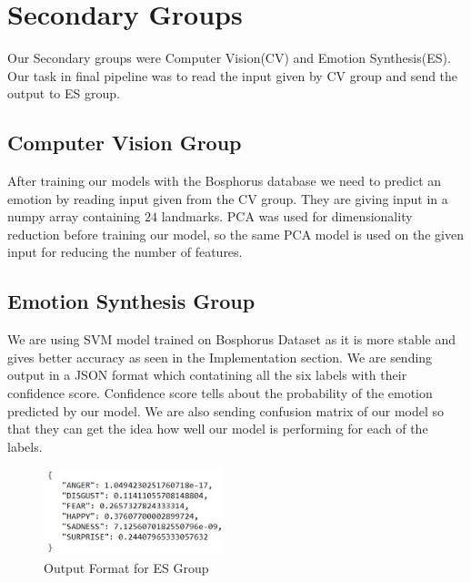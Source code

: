 \section{Secondary Groups}

Our Secondary groups were Computer Vision(CV) and Emotion Synthesis(ES). Our task in final pipeline was to read the input given by CV group and send the output to ES group.

\subsection{Computer Vision Group}
After training our models with the Bosphorus database we need to predict an emotion by reading input given from the CV group. They are giving input in a numpy array containing $24$ landmarks. PCA was used for dimensionality reduction before training our model, so the same PCA model is used on the given input for reducing the number of features. 

\subsection{Emotion Synthesis Group}
We are using SVM model trained on Bosphorus Dataset as it is more stable and gives better accuracy as seen in the Implementation section. We are sending output in a JSON format which contatining all the six labels with their confidence score. Confidence score tells about the probability of the emotion predicted by our model. We are also sending confusion matrix of our model so that they can get the idea how well our model is performing for each of the labels.


\begin{figure}[H]
    \centering
    \includegraphics[height= 25mm]{figures/emotion_output.jpg}
    \caption{Output Format for ES Group}
    \label{emotion_output}
\end{figure}


